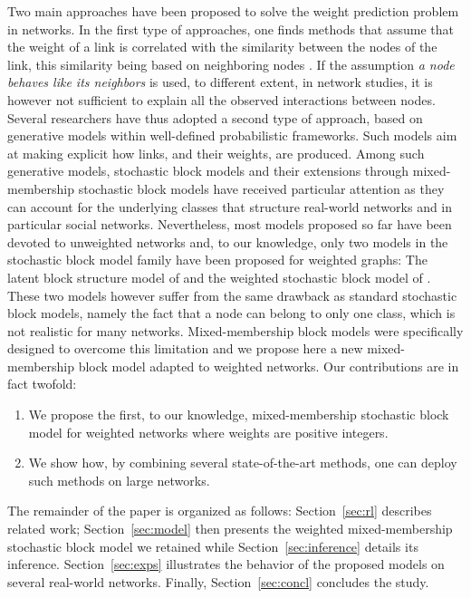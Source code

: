 Two main approaches have been proposed to solve the weight prediction problem \cite{Lu2011} in networks. In the first type of approaches, one finds methods that assume that the weight of a link is correlated with the similarity between the nodes of the link, this similarity being based on neighboring nodes \cite{Zhao2015,Zhu2016}. If the assumption \textit{a node behaves like its neighbors} is used, to different extent, in network studies, it is however not sufficient to explain all the observed interactions between nodes. Several researchers have thus adopted a second type of approach, based on generative models within well-defined probabilistic frameworks. Such models aim at making explicit how links, and their weights, are produced. Among such generative models, stochastic block models and their extensions through mixed-membership stochastic block models have received particular attention \cite{ Karrer2011,airoldi2009mixed,iMMSB,fan2015dynamic} as they can account for the underlying classes that structure real-world networks and in particular social networks. Nevertheless, most models proposed so far have been devoted to unweighted networks and, to our knowledge, only two models in the stochastic block model family have been proposed for weighted graphs: The latent block structure model of \cite{aicher2014learning} and the weighted stochastic block model of \cite{peixoto2018nonparametric}. These two models however suffer from the same drawback as standard stochastic block models, namely the fact that a node can belong to only one class, which is not realistic for many networks. Mixed-membership block models were specifically designed to overcome this limitation and we propose here a new mixed-membership block model adapted to weighted networks. Our contributions are in fact twofold:
%
\begin{enumerate}
\item We propose the first, to our knowledge, mixed-membership stochastic block model for weighted networks where weights are positive integers.
\item We show how, by combining several state-of-the-art methods, one can deploy such methods on large networks.
\end{enumerate}
%
The remainder of the paper is organized as follows: Section~\ref{sec:rl} describes related work; Section~\ref{sec:model} then presents the weighted mixed-membership stochastic block model we retained while Section~\ref{sec:inference} details its inference. Section~\ref{sec:exps} illustrates the behavior of the proposed models on several real-world networks. Finally, Section~\ref{sec:concl} concludes the study.


